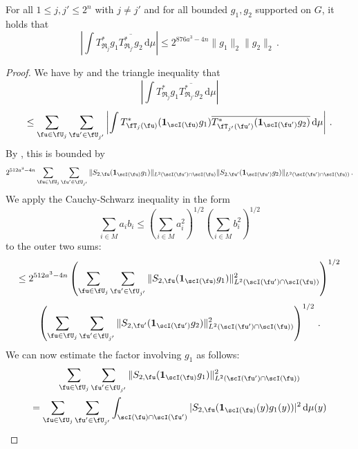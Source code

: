 \begin{lemma}
    \label{row-correlation}
    \leanok
    For all $1 \le j,j' \le 2^n$ with $j\ne j'$ and for all bounded $g_1, g_2$ supported on $G$, it holds that
    $$
        \left| \int T_{\mathfrak{R}_j}^*g_1 \overline{T_{\mathfrak{R}_{j'}}^*g_2} \, \mathrm{d}\mu \right| \le
        2^{876a^3-4n}\|g_1\|_2 \|g_2\|_2\,.
    $$
\end{lemma}

\begin{proof}
    \leanok
    We have by  and the triangle inequality that
    $$
        \left| \int T_{\mathfrak{R}_j}^*g_1 \overline{T_{\mathfrak{R}_{j'}}^*g_2} \, \mathrm{d}\mu \right|
    $$
    $$
        \le \sum_{\fu \in \fU_j} \sum_{\fu' \in \fU_{j'}} \left| \int T^*_{\fT_j(\fu)} (\mathbf{1}_{\scI(\fu)} g_1) \overline{T^*_{\fT_{j'}(\fu')} (\mathbf{1}_{\scI(\fu')} g_2)} \, \mathrm{d}\mu \right|\,.
    $$
    By , this is bounded by
    \begin{equation}
        \label{eq-S2uu'}
         2^{512a^3-4n} \sum_{\fu \in \fU_j} \sum_{\fu' \in \fU_{j'}} \|S_{2,\fu} (\mathbf{1}_{\scI(\fu)}g_1)\|_{L^2(\scI(\fu')\cap \scI(\fu)} \|S_{2, \fu'} (\mathbf{1}_{\scI(\fu')}g_2)\|_{L^2(\scI(\fu')\cap\scI(\fu))}\,.
    \end{equation}
    We apply the Cauchy-Schwarz inequality in the form
    \begin{equation*}
        \sum_{i \in M} a_i b_i \le (\sum_{i \in M} a_i^2 )^{1/2}(\sum_{i \in M} b_i^2 )^{1/2}
    \end{equation*} to the outer two sums:
    $$
        \le 2^{512a^3-4n} \left(\sum_{\fu \in \fU_j} \sum_{\fu' \in \fU_{j'}} \|S_{2,\fu} (\mathbf{1}_{\scI(\fu)}g_1)\|_{L^2(\scI(\fu')\cap \scI(\fu))}^2 \right)^{1/2}
    $$
    $$
        \left(\sum_{\fu \in \fU_j} \sum_{\fu' \in \fU_{j'}} \|S_{2,\fu'} (\mathbf{1}_{\scI(\fu')}g_2)\|_{L^2(\scI(\fu')\cap\scI(\fu))}^2 \right)^{1/2}\,.
    $$
    We can now estimate the factor involving $g_1$ as follows:
    \begin{multline*}
        \sum_{\fu \in \fU_j}\sum_{\fu' \in \fU_{j'}} \|S_{2,\fu} (\mathbf{1}_{\scI(\fu)}g_1)\|_{L^2(\scI(\fu')\cap \scI(\fu))}^2
        \\ = \sum_{\fu \in \fU_j}\sum_{\fu' \in \fU_{j'}} \int_{\scI(\fu) \cap \scI(\fu')} |S_{2,\fu} (\mathbf{1}_{\scI(\fu)}(y)g_1(y))|^2 \, \mathrm{d}\mu(y)

\end{multline*}
\end{proof}
